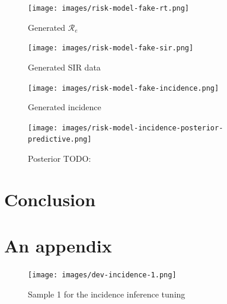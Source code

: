 \documentclass[
  digital, %
  oneside, %
  lof,     %
  lot,     %
]{fithesis4}
\begin{document}
\begin{figure}[h]
  \begin{center}
    \texttt{[image: images/risk-model-fake-rt.png]}
  \end{center}
  \caption{Generated $\mathcal{R}_{e}$}
  \label{fig:risk-model-fake-rt}
\end{figure}

\begin{figure}[h]
  \begin{center}
    \texttt{[image: images/risk-model-fake-sir.png]}
  \end{center}
  \caption{Generated SIR data}
  \label{fig:risk-model-fake-sir}
\end{figure}

\begin{figure}[h]
  \begin{center}
    \texttt{[image: images/risk-model-fake-incidence.png]}
  \end{center}
  \caption{Generated incidence}
  \label{fig:risk-model-fake-incidence}
\end{figure}

\begin{figure}[h]
  \begin{center}
    \texttt{[image: images/risk-model-incidence-posterior-predictive.png]}
  \end{center}
  \caption{Posterior TODO:}
  \label{fig:risk-model-fake-incidence}
\end{figure}


\chapter{Conclusion}


\cite{blei2018}





\cite{pfeffer2016}
\cite{davidson-pilon2015}


\printbibliography[heading=bibintoc]

\appendix

\chapter{An appendix}




\begin{figure}[h]
  \begin{center}
    \texttt{[image: images/dev-incidence-1.png]}
  \end{center}
  \caption{Sample 1 for the incidence inference tuning}
  \label{fig:dev-incidence-1}
\end{figure}
\end{document}

